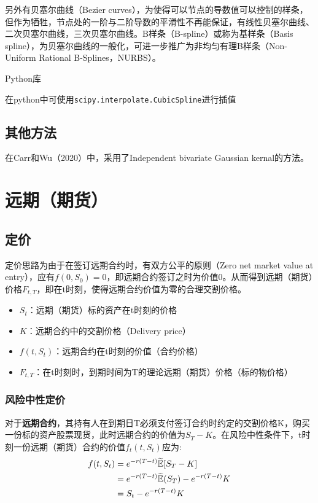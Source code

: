 \documentclass[11pt]{article}
\begin{document}
另外有贝塞尔曲线（Bezier curves），为使得可以节点的导数值可以控制的样条，但作为牺牲，节点处的一阶与二阶导数的平滑性不再能保证，有线性贝塞尔曲线、二次贝塞尔曲线，三次贝塞尔曲线。B样条（B-spline）或称为基样条（Basis spline），为贝塞尔曲线的一般化，可进一步推广为非均匀有理B样条（Non-Uniform Rational B-Splines，NURBS）。

\begin{remark}
    Python库

    在python中可使用\verb|scipy.interpolate.CubicSpline|进行插值
\end{remark}

\subsection{其他方法}

在Carr和Wu（2020）中，采用了Independent bivariate Gaussian kernal的方法。

\section{远期（期货）}

\subsection{定价}

定价思路为由于在签订远期合约时，有双方公平的原则（Zero net market value at entry），应有$f(0,S_0)=0$，即远期合约签订之时为价值0。从而得到远期（期货）价格$F_{t,T}$，即在t时刻，使得远期合约价值为零的合理交割价格。
\begin{itemize}
    \item $S_t$：远期（期货）标的资产在t时刻的价格
    \item $K$：远期合约中的交割价格（Delivery price）
    \item $f(t,S_t)$：远期合约在t时刻的价值（合约价格）
    \item $F_{t,T}$：在t时刻时，到期时间为T的理论远期（期货）价格（标的物价格）
\end{itemize}

\subsubsection{风险中性定价}

对于\textbf{远期合约}，其持有人在到期日T必须支付签订合约时约定的交割价格K，购买一份标的资产股票现货，此时远期合约的价值为$S_T-K$。在风险中性条件下，t时刻一份远期（期货）合约的价值$f_t(t,S_t)$应为:
\begin{align*}
    f(t,S_t) &= e^{-r(T-t)} \widetilde{\mathbb{E}}[S_T - K] \\
    &= e^{-r(T-t)} \widetilde{\mathbb{E}}(S_T) - e^{-r(T-t)} K \\
    &= S_t - e^{-r(T-t)} K
\end{align*}
\end{document}
